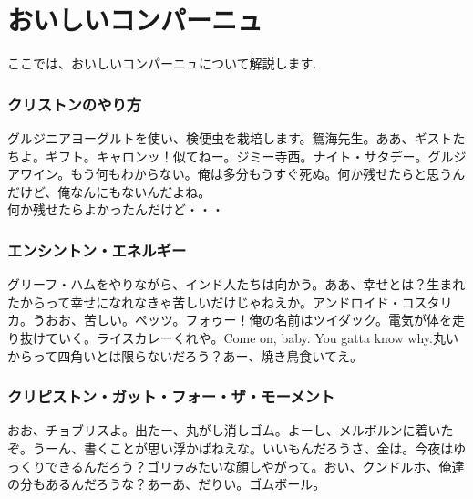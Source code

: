 \documentclass[fleqn,leqno,autodetect-engine,dvipdfmxi-if-dvi,ja=standard]{bxjsarticle}
\begin{document}
\part{おいしいコンパーニュ}
ここでは、おいしいコンパーニュについて解説します.

\section{クリストンのやり方}
グルジニアヨーグルトを使い、検便虫を栽培します。鴛海先生。ああ、ギストたちよ。ギフト。キャロンッ！似てねー。ジミー寺西。ナイト・サタデー。グルジアワイン。もう何もわからない。俺は多分もうすぐ死ぬ。何か残せたらと思うんだけど、俺なんにもないんだよね。\\

何か残せたらよかったんだけど・・・

\section{エンシントン・エネルギー}
グリーフ・ハムをやりながら、インド人たちは向かう。ああ、幸せとは？生まれたからって幸せになれなきゃ苦しいだけじゃねえか。アンドロイド・コスタリカ。うおお、苦しい。ペッツ。フォゥー！俺の名前はツイダック。電気が体を走り抜けていく。ライスカレーくれや。Come on, baby. You gatta know why.丸いからって四角いとは限らないだろう？あー、焼き鳥食いてえ。

\section{クリピストン・ガット・フォー・ザ・モーメント}
おお、チョブリスよ。出たー、丸がし消しゴム。よーし、メルボルンに着いたぞ。うーん、書くことが思い浮かばねえな。いいもんだろうさ、金は。今夜はゆっくりできるんだろう？ゴリラみたいな顔しやがって。おい、クンドルホ、俺達の分もあるんだろうな？あーあ、だりい。ゴムボール。
\end{document}
